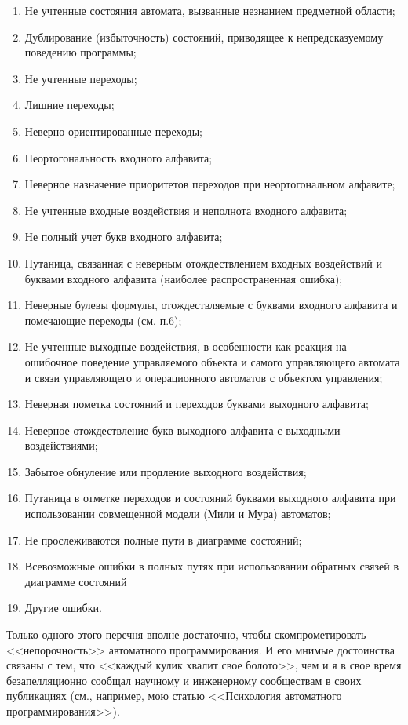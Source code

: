 \documentclass[12pt, twoside]{report}
\begin{document}
\begin{enumerate}
  \item Не учтенные состояния автомата, вызванные незнанием предметной области; 
  \item Дублирование (избыточность) состояний, приводящее к непредсказуемому поведению программы; 
  \item Не учтенные переходы; 
  \item Лишние переходы; 
  \item Неверно ориентированные переходы; 
  \item Неортогональность входного алфавита; 
  \item Неверное назначение приоритетов переходов при неортогональном алфавите; 
  \item Не учтенные входные воздействия и неполнота входного алфавита; 
  \item Не полный учет букв входного алфавита; 
  \item Путаница, связанная с неверным отождествлением входных воздействий и буквами входного алфавита (наиболее распространенная ошибка); 
  \item Неверные булевы формулы, отождествляемые с буквами входного алфавита и помечающие переходы (см. п.6); 
  \item Не учтенные выходные воздействия, в особенности как реакция на ошибочное поведение управляемого объекта и самого управляющего автомата и связи управляющего и операционного автоматов с объектом управления; 
  \item Неверная пометка состояний и переходов буквами выходного алфавита; 
  \item Неверное отождествление букв выходного алфавита с выходными воздействиями; 
  \item Забытое обнуление или продление выходного воздействия; 
  \item Путаница в отметке переходов и состояний буквами выходного алфавита при использовании совмещенной модели (Мили и Мура) автоматов; 
  \item Не прослеживаются полные пути в диаграмме состояний; 
  \item Всевозможные ошибки в полных путях при использовании обратных связей в диаграмме состояний 
  \item Другие ошибки.
\end{enumerate}
Только одного этого перечня вполне достаточно, чтобы скомпрометировать <<непорочность>> автоматного программирования. 
И его мнимые достоинства связаны с тем, что <<каждый кулик хвалит свое болото>>, чем и я в свое время безапелляционно 
сообщал научному и инженерному сообществам в своих публикациях (см., например, мою статью <<Психология автоматного программирования>>).
\end{document}
